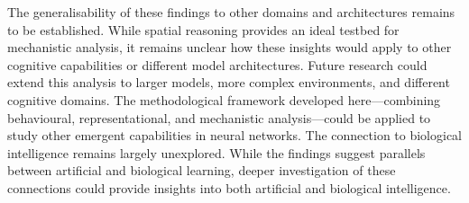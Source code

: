 The generalisability of these findings to other domains and architectures remains to be established. While spatial reasoning provides an ideal testbed for mechanistic analysis, it remains unclear how these insights would apply to other cognitive capabilities or different model architectures. Future research could extend this analysis to larger models, more complex environments, and different cognitive domains. The methodological framework developed here—combining behavioural, representational, and mechanistic analysis—could be applied to study other emergent capabilities in neural networks. The connection to biological intelligence remains largely unexplored. While the findings suggest parallels between artificial and biological learning, deeper investigation of these connections could provide insights into both artificial and biological intelligence.

